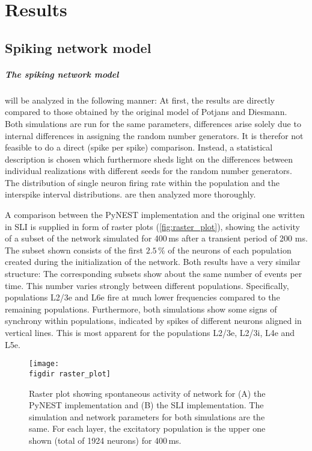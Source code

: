 \chapter{Results}
\label{sec:results}

\section{Spiking network model}
\paragraph{The spiking network model} will be analyzed in the following manner: 
At first, the results are directly compared to those obtained by the original 
model of Potjans and Diesmann. Both simulations are run for the same parameters, 
differences arise solely due to internal differences in assigning the random 
number generators. It is therefor not feasible to do a direct (spike per spike) 
comparison. Instead, a statistical description is chosen which furthermore sheds light
on the differences between individual realizations with different seeds for the 
random number generators.
The distribution of single neuron firing rate within the population
and the interspike interval distributions.
are then analyzed more thoroughly. 

A comparison between the PyNEST implementation and the original one written in SLI
is supplied in form of raster plots (\autoref{fig:raster_plot}), 
showing the activity of a subset of the network simulated for 400\,ms 
after a transient period of 200 ms. The subset shown consists of the first 
$2.5\,\%$ of the neurons of each population created during the initialization of the network. 
Both results have a very similar structure: 
The corresponding subsets show about the same number of events per time. This 
number varies strongly between different populations. Specifically, populations L2/3e and L6e 
fire at much lower frequencies compared to the remaining populations. 
Furthermore, both simulations show some signs of synchrony within populations, indicated by spikes 
of different neurons aligned in vertical lines. This is most apparent for the populations L2/3e, L2/3i, L4e and 
L5e.
\begin{figure}[tb]
    \centering
    \texttt{[image: \\figdir raster\_plot]}
    \caption[Raster plot: PyNEST and SLI]{
        Raster plot showing spontaneous activity of network for 
        (A) the PyNEST implementation and (B) the SLI implementation.
        The simulation and network parameters for both simulations are 
        the same. 
        For each layer, the excitatory population is the upper one shown 
        (total of 1924 neurons) for 400\,ms. 
    }
    \label{fig:raster_plot}
\end{figure}

